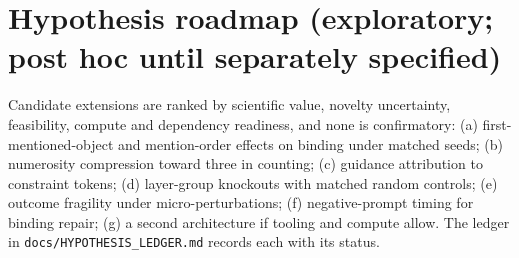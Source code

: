 \section{Hypothesis roadmap (exploratory; post hoc until separately specified)}
Candidate extensions are ranked by scientific value, novelty uncertainty, feasibility, compute and dependency readiness, and none is confirmatory: (a) first-mentioned-object and mention-order effects on binding under matched seeds; (b) numerosity compression toward three in counting; (c) guidance attribution to constraint tokens; (d) layer-group knockouts with matched random controls; (e) outcome fragility under micro-perturbations; (f) negative-prompt timing for binding repair; (g) a second architecture if tooling and compute allow. The ledger in \texttt{docs/HYPOTHESIS\_LEDGER.md} records each with its status.
